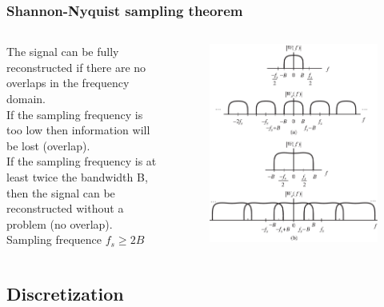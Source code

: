 \begin{frame}
	\frametitle{Shannon-Nyquist sampling theorem}
	\begin{columns}
		The signal can be fully reconstructed if there are no overlaps in the frequency domain.\\
		If the sampling frequency is too low then information will be lost (overlap).\\
		If the sampling frequency is at least twice the bandwidth B, then the signal can be reconstructed without a problem (no overlap).\\
		\medskip
		Sampling frequence $f_s \geq 2 B$
		\begin{figure}
			\includegraphics[width=1\linewidth]{nyquist}
		\end{figure}
	\end{columns}
\end{frame}

\subsection{Discretization}

